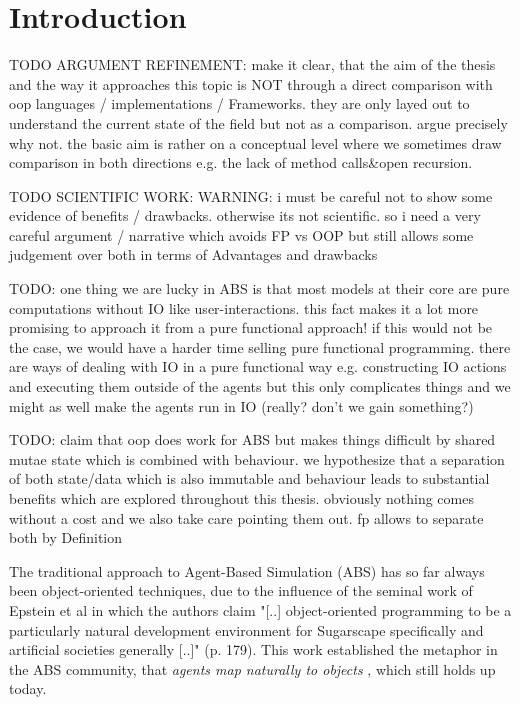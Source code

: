 \chapter{Introduction}
\label{ch:intro}

TODO ARGUMENT REFINEMENT: make it clear, that the aim of the thesis and the way it approaches this topic is NOT through a direct comparison with oop languages / implementations / Frameworks. they are only layed out to understand the current state of the field but not as a comparison. argue precisely why not. the basic aim is rather on a conceptual level where we sometimes draw comparison in both directions e.g. the lack of method calls\&open recursion.

TODO SCIENTIFIC WORK: WARNING: i must be careful not to show some evidence of benefits / drawbacks. otherwise its not scientific. so i need a very careful argument / narrative which avoids FP vs OOP but still allows some judgement over both in terms of Advantages and drawbacks

TODO: one thing we are lucky in ABS is that most models at their core are pure computations without IO like user-interactions. this fact makes it a lot more promising to approach it from a pure functional approach! if this would not be the case, we would have a harder time selling pure functional programming. there are ways of dealing with IO in a pure functional way e.g. constructing IO actions and executing them outside of the agents but this only complicates things and we might as well make the agents run in IO (really? don't we gain something?)

TODO: claim that oop does work for ABS but makes things difficult by shared mutae state which is combined with behaviour. we hypothesize that a separation of both  state/data which is also immutable and behaviour leads to substantial benefits which are explored throughout this thesis. obviously nothing comes without a cost and we also take care pointing them out. fp allows to separate both by Definition

The traditional approach to Agent-Based Simulation (ABS) has so far always been object-oriented techniques, due to the influence of the seminal work of Epstein et al \cite{epstein_growing_1996} in which the authors claim "[..] object-oriented programming to be a particularly natural development environment for Sugarscape specifically and artificial societies generally [..]" (p. 179). This work established the metaphor in the ABS community, that \textit{agents map naturally to objects} \cite{north_managing_2007}, which still holds up today.

